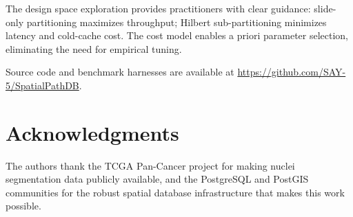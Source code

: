 \documentclass[sigconf]{acmart}
\begin{document}
The design space exploration provides practitioners with clear guidance: slide-only partitioning maximizes throughput; Hilbert sub-partitioning minimizes latency and cold-cache cost.
The cost model enables a priori parameter selection, eliminating the need for empirical tuning.

Source code and benchmark harnesses are available at \url{https://github.com/SAY-5/SpatialPathDB}.

\section*{Acknowledgments}
The authors thank the TCGA Pan-Cancer project for making nuclei segmentation data publicly available, and the PostgreSQL and PostGIS communities for the robust spatial database infrastructure that makes this work possible.
\end{document}
